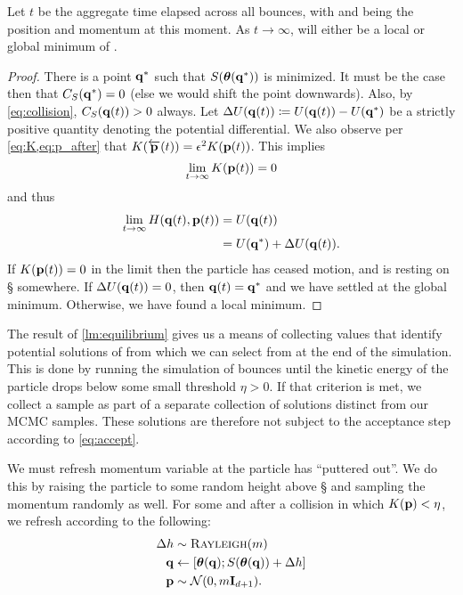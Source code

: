 \begin{lemma}
    \label{lm:equilibrium}
    Let $t$ be the aggregate time elapsed across all bounces, with \qt{} and
    \pt{} being the position and momentum at this moment. As $t \rightarrow
    \infty$, \thetaof{\qt{}} will either be a local or global minimum of
    \surface{}.
\end{lemma}
\begin{proof}
    There is a point $\mathbf{q}{}^*$ such that $S(\boldsymbol{\theta}(\mathbf{q}{}^*))$ is minimized.
    It must be the case then that $C_{S}({\mathbf{q}{}^*}) = 0$ (else we would shift the
    point downwards). Also, by \cref{eq:collision}, $C_{S}({\mathbf{q}(t){}}) > 0$ always.
    Let $\Delta U(\mathbf{q}(t){}) \coloneqq U(\mathbf{q}(t){}) - U(\mathbf{q}{}^*)$ be a strictly positive
    quantity denoting the potential differential. We also observe per
    \cref{eq:K,eq:p_after} that $K(\overleftarrow{\mathbf{p}}(t)) = \epsilon^2
    K(\mathbf{p}(t){})$. This implies
    \begin{equation*}
        \lim_{t \rightarrow \infty} K(\mathbf{p}(t){}) = 0
    \end{equation*}
    and thus
    \begin{align*}
        \lim_{t \rightarrow \infty} H(\mathbf{q}(t){}, \mathbf{p}(t){}) &= U(\mathbf{q}(t){}) \\
        &= U(\mathbf{q}{}^*) + \Delta U(\mathbf{q}(t){}).
    \end{align*}
    If $K(\mathbf{p}(t){}) = 0$ in the limit then the particle has ceased motion, and is
    resting on \S{} somewhere. If $\Delta U(\mathbf{q}(t){}) = 0$, then $\mathbf{q}(t){} = \mathbf{q}{}^*$
    and we have settled at the global minimum. Otherwise, we have found a local
    minimum.
\end{proof}

The result of \cref{lm:equilibrium} gives us a means of collecting values
\thetab{} that identify potential solutions of \target{} from which we can
select from at the end of the simulation. This is done by running the simulation
of bounces until the kinetic energy of the particle drops below some small
threshold $\eta > 0$. If that criterion is met, we collect a sample as part of a
separate collection of solutions distinct from our MCMC samples. These solutions
are therefore not subject to the acceptance step according to \cref{eq:accept}.

We must refresh momentum variable at the particle has ``puttered out''. We do
this by raising the particle to some random height above \S{} and sampling the
momentum randomly as well. For some \q{} and \p{} after a collision in which
$K(\mathbf{p}{}) < \eta$, we refresh according to the following:
\begin{align*}
    \Delta h &\sim \textsc{Rayleigh}(m) \\
    \mathbf{q}{} &\gets [\boldsymbol{\theta}(\mathbf{q}); S(\boldsymbol{\theta}(\mathbf{q})) + \Delta h] \\
    \mathbf{p}{} &\sim \mathcal{N}(0, m\mathbf{I}_{d+1}).
\end{align*}

